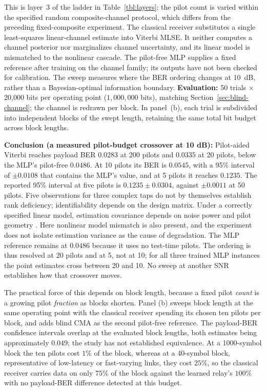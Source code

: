 This is layer~3 of the ladder in Table~\ref{tbl:layers}: the pilot count is varied within the specified random composite-channel protocol, which differs from the preceding fixed-composite experiment. The classical receiver substitutes a single least-squares linear-channel estimate into Viterbi MLSE. It neither computes a channel posterior nor marginalizes channel uncertainty, and its linear model is mismatched to the nonlinear cascade. The pilot-free MLP supplies a fixed reference after training on the channel family; its outputs have not been checked for calibration. The sweep measures where the BER ordering changes at 10~dB, rather than a Bayesian-optimal information boundary. \textbf{Evaluation:} 50 trials $\times$ 20{,}000 bits per operating point ($1{,}000{,}000$ bits), matching Section~\ref{sec:blind-channel}; the channel is redrawn per block. In panel~(b), each trial is subdivided into independent blocks of the swept length, retaining the same total bit budget across block lengths.

\textbf{Conclusion (a measured pilot-budget crossover at 10 dB):} Pilot-aided Viterbi reaches payload BER $0.0283$ at 200 pilots and $0.0335$ at 20 pilots, below the MLP's pilot-free $0.0486$. At 10 pilots its BER is $0.0545$, with a 95\% interval of $\pm 0.0108$ that contains the MLP's value, and at 5 pilots it reaches $0.1235$. The reported 95\% interval at five pilots is $0.1235 \pm 0.0304$, against $\pm 0.0011$ at 50 pilots. Five observations for three complex taps do not by themselves establish rank deficiency; identifiability depends on the design matrix. Under a correctly specified linear model, estimation covariance depends on noise power and pilot geometry \cite{Kay1993Estimation}. Here nonlinear model mismatch is also present, and the experiment does not isolate estimation variance as the cause of degradation. The MLP reference remains at $0.0486$ because it uses no test-time pilots. The ordering is thus resolved at 20 pilots and at 5, not at 10; for all three trained MLP instances the point estimates cross between 20 and 10. No sweep at another SNR establishes how that crossover moves.

The practical force of this depends on block length, because a fixed pilot \emph{count} is a growing pilot \emph{fraction} as blocks shorten. Panel (b) sweeps block length at the same operating point with the classical receiver spending its chosen ten pilots per block, and adds blind CMA as the second pilot-free reference. The payload-BER confidence intervals overlap at the evaluated block lengths, both estimates being approximately $0.049$; the study has not established equivalence. At a 1000-symbol block the ten pilots cost $1\%$ of the block, whereas at a 40-symbol block, representative of low-latency or fast-varying links, they cost $25\%$, so the classical receiver carries data on only $75\%$ of the block against the learned relay's $100\%$ with no payload-BER difference detected at this budget.

